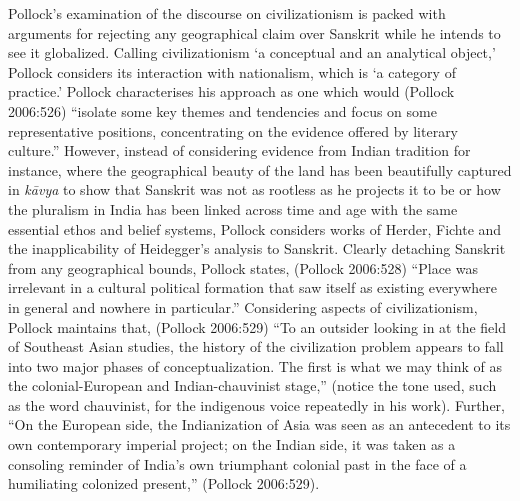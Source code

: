 Pollock’s examination of the discourse on civilizationism is packed with arguments for rejecting any geographical claim over Sanskrit while he intends to see it globalized. Calling civilizationism ‘a conceptual and an analytical object,’ Pollock considers its interaction with nationalism, which is ‘a category of practice.’ Pollock characterises his approach as one which would (Pollock 2006:526) “isolate some key themes and tendencies and focus on some representative positions, concentrating on the evidence offered by literary culture.” However, instead of considering evidence from Indian tradition for instance, where the geographical beauty of the land has been beautifully captured in \textit{kāvya} to show that Sanskrit was not as rootless as he projects it to be or how the pluralism in India has been linked across time and age with the same essential ethos and belief systems, Pollock considers works of Herder, Fichte and the inapplicability of Heidegger’s analysis to Sanskrit. Clearly detaching Sanskrit from any geographical bounds, Pollock states, (Pollock 2006:528) “Place was irrelevant in a cultural political formation that saw itself as existing everywhere in general and nowhere in particular.” Considering aspects of civilizationism, Pollock maintains that, (Pollock 2006:529) “To an outsider looking in at the field of Southeast Asian studies, the history of the civilization problem appears to fall into two major phases of conceptualization. The first is what we may think of as the colonial-European and Indian-chauvinist stage,” (notice the tone used, such as the word chauvinist, for the indigenous voice repeatedly in his work). Further, “On the European side, the Indianization of Asia was seen as an antecedent to its own contemporary imperial project; on the Indian side, it was taken as a consoling reminder of India’s own triumphant colonial past in the face of a humiliating colonized present,” (Pollock 2006:529).


